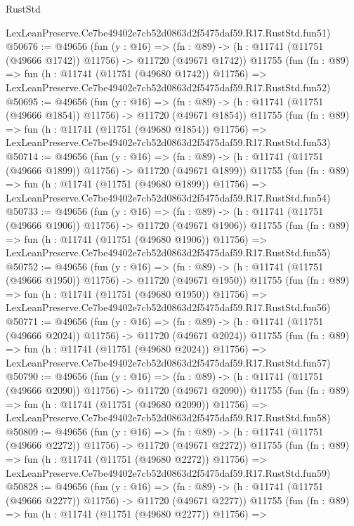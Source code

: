 \begin{lexlean}{RustStd}
\begin{coremodule}
    LexLeanPreserve.Ce7be49402e7cb52d0863d2f5475daf59.R17.RustStd.fun51)
@50676 := @49656
    (fun (y : @16) =>
    (fn : @89) -> (h : @11741 (@11751 (@49666 @1742)) @11756) -> @11720 (@49671 @1742))
    @11755
    (fun (fn : @89) =>
    fun (h : @11741 (@11751 (@49680 @1742)) @11756) =>
    LexLeanPreserve.Ce7be49402e7cb52d0863d2f5475daf59.R17.RustStd.fun52)
@50695 := @49656
    (fun (y : @16) =>
    (fn : @89) -> (h : @11741 (@11751 (@49666 @1854)) @11756) -> @11720 (@49671 @1854))
    @11755
    (fun (fn : @89) =>
    fun (h : @11741 (@11751 (@49680 @1854)) @11756) =>
    LexLeanPreserve.Ce7be49402e7cb52d0863d2f5475daf59.R17.RustStd.fun53)
@50714 := @49656
    (fun (y : @16) =>
    (fn : @89) -> (h : @11741 (@11751 (@49666 @1899)) @11756) -> @11720 (@49671 @1899))
    @11755
    (fun (fn : @89) =>
    fun (h : @11741 (@11751 (@49680 @1899)) @11756) =>
    LexLeanPreserve.Ce7be49402e7cb52d0863d2f5475daf59.R17.RustStd.fun54)
@50733 := @49656
    (fun (y : @16) =>
    (fn : @89) -> (h : @11741 (@11751 (@49666 @1906)) @11756) -> @11720 (@49671 @1906))
    @11755
    (fun (fn : @89) =>
    fun (h : @11741 (@11751 (@49680 @1906)) @11756) =>
    LexLeanPreserve.Ce7be49402e7cb52d0863d2f5475daf59.R17.RustStd.fun55)
@50752 := @49656
    (fun (y : @16) =>
    (fn : @89) -> (h : @11741 (@11751 (@49666 @1950)) @11756) -> @11720 (@49671 @1950))
    @11755
    (fun (fn : @89) =>
    fun (h : @11741 (@11751 (@49680 @1950)) @11756) =>
    LexLeanPreserve.Ce7be49402e7cb52d0863d2f5475daf59.R17.RustStd.fun56)
@50771 := @49656
    (fun (y : @16) =>
    (fn : @89) -> (h : @11741 (@11751 (@49666 @2024)) @11756) -> @11720 (@49671 @2024))
    @11755
    (fun (fn : @89) =>
    fun (h : @11741 (@11751 (@49680 @2024)) @11756) =>
    LexLeanPreserve.Ce7be49402e7cb52d0863d2f5475daf59.R17.RustStd.fun57)
@50790 := @49656
    (fun (y : @16) =>
    (fn : @89) -> (h : @11741 (@11751 (@49666 @2090)) @11756) -> @11720 (@49671 @2090))
    @11755
    (fun (fn : @89) =>
    fun (h : @11741 (@11751 (@49680 @2090)) @11756) =>
    LexLeanPreserve.Ce7be49402e7cb52d0863d2f5475daf59.R17.RustStd.fun58)
@50809 := @49656
    (fun (y : @16) =>
    (fn : @89) -> (h : @11741 (@11751 (@49666 @2272)) @11756) -> @11720 (@49671 @2272))
    @11755
    (fun (fn : @89) =>
    fun (h : @11741 (@11751 (@49680 @2272)) @11756) =>
    LexLeanPreserve.Ce7be49402e7cb52d0863d2f5475daf59.R17.RustStd.fun59)
@50828 := @49656
    (fun (y : @16) =>
    (fn : @89) -> (h : @11741 (@11751 (@49666 @2277)) @11756) -> @11720 (@49671 @2277))
    @11755
    (fun (fn : @89) =>
    fun (h : @11741 (@11751 (@49680 @2277)) @11756) =>

\end{coremodule}
\end{lexlean}
